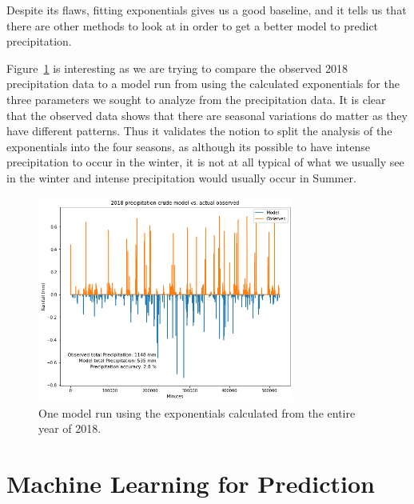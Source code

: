 \documentclass[11pt]{report}
\begin{document}
Despite its flaws, fitting exponentials gives us a good baseline, and it
tells us that there are other methods to look at in order to get a better
model to predict precipitation.

Figure~\ref{crudesmodel_whole2018} is interesting as we are trying to
compare the observed 2018 precipitation data to a model run from using the
calculated exponentials for the three parameters we sought to analyze from
the precipitation data. It is clear that the observed data shows that there
are seasonal variations do matter as they have different patterns.  Thus it
validates the notion to split the analysis of the exponentials into the four
seasons, as although its possible to have intense precipitation to occur in
the winter, it is not at all typical of what we usually see in the winter
and intense precipitation would usually occur in Summer.\\[1em]

\begin{figure}[h!]
  \centering
  \includegraphics[width=0.75\textwidth]{Figures/whole2018_model.png}
  \caption[Running model for entire 2018 ]
  {\label{crudesmodel_whole2018}One model run using the exponentials calculated from
    the entire year of 2018. }
\end{figure}

\clearpage

\section{Machine Learning for Prediction}\label{sec:MLP}


\end{document}
